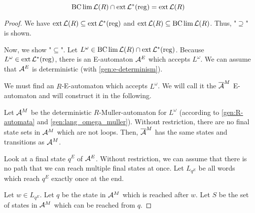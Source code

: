 \begin{lemma}
\label{gen:R-bclim-cap-ext}
\[ \operatorname{BC} \lim \mathcal{L}(R) \cap \operatorname{ext} \mathcal{L}^*(\textup{\textrm{reg}}) = \operatorname{ext} \mathcal{L}(R) \]

\begin{proof}
We have $\operatorname{ext} \mathcal{L}(R) \subseteq \operatorname{ext} \mathcal{L}^*(\textup{\textrm{reg}})$ and $\operatorname{ext} \mathcal{L}(R) \subseteq \operatorname{BC} \lim \mathcal{L}(R)$. Thus, "$\supseteq$" is shown.

Now, we show "$\subseteq$". Let $L^\omega \in \operatorname{BC} \lim \mathcal{L}(R) \cap \operatorname{ext} \mathcal{L}^*(\textup{\textrm{reg}})$. Because $L^\omega \in \operatorname{ext} \mathcal{L}^*(\textup{\textrm{reg}})$, there is an E-automaton $\mathcal{A}^E$ which accepts $L^\omega$. We can assume that $\mathcal{A}^E$ is deterministic (with \cref{gen:e-determinism}).

We must find an $R$-E-automaton which accepts $L^\omega$. We will call it the $\overline{\mathcal{A}}^M$ E-automaton and will construct it in the following.

Let $\mathcal{A}^M$ be the deterministic $R$-Muller-automaton for $L^\omega$ (according to \cref{gen:R-automata} and \cref{gen:lang_omega_muller}). Without restriction, there are no final state sets in $\mathcal{A}^M$ which are not loops. Then, $\overline{\mathcal{A}}^M$ has the same states and transitions as $\mathcal{A}^M$.

Look at a final state $q^E$ of $\mathcal{A}^E$. Without restriction, we can assume that there is no path that we can reach multiple final states at once. Let $L_{q^E}$ be all words which reach $q^E$ exactly once at the end.

Let $w \in L_{q^E}$.
Let $q$ be the state in $\mathcal{A}^M$ which is reached after $w$. Let $S$ be the set of states in $\mathcal{A}^M$ which can be reached from $q$.


\end{proof}
\end{lemma}

